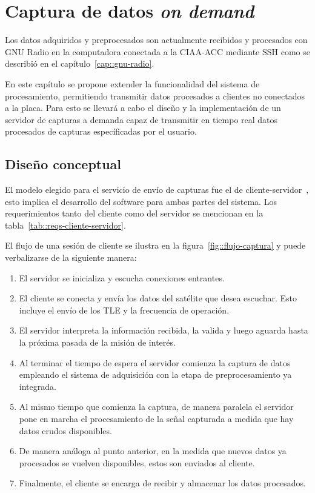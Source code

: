 \documentclass[../../main.tex]{subfiles}
\begin{document}
\graphicspath{{./figures}}
\chapter{Captura de datos \textit{on demand}}\label{cap::server-capturas}
Los datos adquiridos y preprocesados son actualmente recibidos y procesados con GNU Radio en la computadora conectada a la CIAA-ACC mediante SSH como se describió en el capítulo~\ref{cap::gnu-radio}.

En este capítulo se propone extender la funcionalidad del sistema de procesamiento, permitiendo transmitir datos procesados a clientes no conectados a la placa. Para esto se llevará a cabo el diseño y la implementación de un servidor de capturas a demanda capaz de transmitir en tiempo real datos procesados de capturas específicadas por el usuario.

\section{Diseño conceptual}
El modelo elegido para el servicio de envío de capturas fue el de cliente-servidor~\cite{client-server-model}, esto implica el desarrollo del software para ambas partes del sistema. Los requerimientos tanto del cliente como del servidor se mencionan en la tabla~\ref{tab::reqs-cliente-servidor}.

El flujo de una sesión de cliente se ilustra en la figura~\ref{fig::flujo-captura} y puede verbalizarse de la siguiente manera:
\begin{enumerate}
    \item El servidor se inicializa y escucha conexiones entrantes.
    \item El cliente se conecta y envía los datos del satélite que desea escuchar. Esto incluye el envío de los TLE y la frecuencia de operación.
    \item El servidor interpreta la información recibida, la valida y luego aguarda hasta la próxima pasada de la misión de interés.
    \item Al terminar el tiempo de espera el servidor comienza la captura de datos empleando el sistema de adquisición con la etapa de preprocesamiento ya integrada.
    \item Al mismo tiempo que comienza la captura, de manera paralela el servidor pone en marcha el procesamiento de la señal capturada a medida que hay datos crudos disponibles.
    \item De manera análoga al punto anterior, en la medida que nuevos datos ya procesados se vuelven disponibles, estos son enviados al cliente.
    \item Finalmente, el cliente se encarga de recibir y almacenar los datos procesados.
\end{enumerate}
\end{document}
